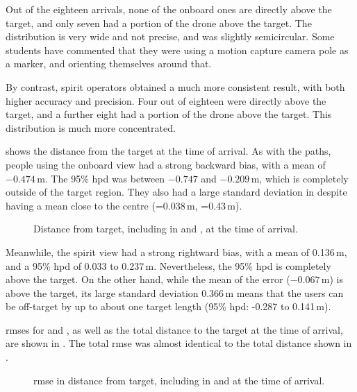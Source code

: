   Out of the eighteen arrivals, none of the onboard ones are directly above the target, and only seven had a portion of the drone above the target.
  The distribution is very wide and not precise, and was slightly semicircular.
  Some students have commented that they were using a motion capture camera pole as a marker, and orienting themselves around that.

  By contrast, \gls{spirit} operators obtained a much more consistent result, with both higher accuracy and precision.
  Four out of eighteen were directly above the target, and a further eight had a portion of the drone above the target.
  This distribution is much more concentrated.

   shows the distance from the target at the time of arrival.
  As with the paths, people using the onboard view had a strong backward bias, with a mean of $-0.474$\,m.
  The 95\% \gls{hpd} was between $-0.747$ and $-0.209$\,m, which is completely outside of the target region.
  They also had a large standard deviation in  despite having a mean close to the centre (=0.038\,m, =0.43\,m).


  \begin{figure}[h]
    \centering
    
    \caption[Arrival distance]{Distance from target, including in  and , at the time of arrival.}
    \label{fig:distance}
  \end{figure}

  Meanwhile, the \gls{spirit} view had a strong rightward bias, with a mean of 0.136\,m, and a 95\% \gls{hpd} of 0.033 to 0.237\,m.
  Nevertheless, the 95\% \gls{hpd} is completely above the target.
  On the other hand, while the mean of the  error ($-0.067$\,m) is above the target, its large standard deviation 0.366\,m means that the users can be off-target by up to about one target length (95\% \gls{hpd}: -0.287 to 0.141\,m).

  \glspl{rmse} for  and , as well as the total distance to the target at the time of arrival, are shown in .
  The total \gls{rmse} was almost identical to the total distance shown in .

  \begin{figure}[h]
    \centering
    
    \caption[Arrival RMS Error]{\gls{rmse} in distance from target, including in  and  at the time of arrival.}
    \label{fig:rmse}
  \end{figure}

